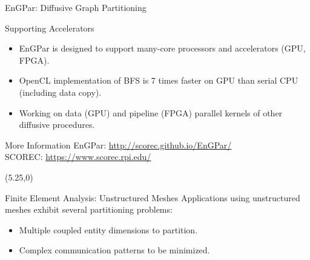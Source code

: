 \documentclass{beamer}
\begin{document}
\begin{textblock}{15.6}
\begin{textblock}{5.1}
\begin{block}{\centering EnGPar: Diffusive Graph Partitioning}
    \end{block}
    \begin{block}{\centering Supporting Accelerators}
      \begin{itemize}
      \item EnGPar is designed to support many-core processors and accelerators (GPU, FPGA).
      \item OpenCL implementation of BFS is 7 times faster on GPU than serial CPU (including data copy).
      \item Working on data (GPU) and pipeline (FPGA) parallel kernels of other diffusive procedures.
      \end{itemize}

    \end{block}
    \begin{block}{\centering More Information}
      EnGPar: \url{http://scorec.github.io/EnGPar/} \\
      SCOREC: \url{https://www.scorec.rpi.edu/}
    \end{block}

  \end{textblock}
  \begin{textblock}{5.1}(5.25,0)
    \begin{block}{\centering Finite Element Analysis: Unstructured Meshes}
      Applications using unstructured meshes exhibit several partitioning problems:
      \begin{itemize}
      \item Multiple coupled entity dimensions to partition.
      \item Complex communication patterns to be minimized.
      \end{itemize}
      

\end{block}
\end{textblock}
\end{textblock}
\end{document}
